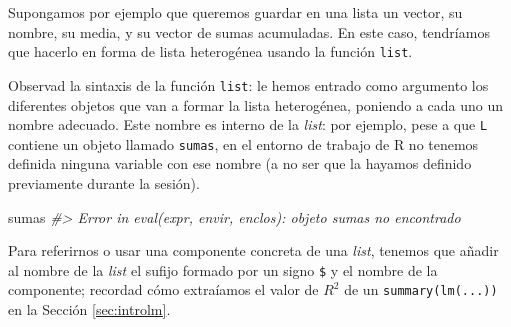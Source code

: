 \documentclass[
]{book}
\newenvironment{Shaded}{\begin{snugshade}}{\end{snugshade}}
\newcommand{\CommentTok}[1]{\textcolor[rgb]{0.56,0.35,0.01}{\textit{#1}}}
\newcommand{\DataTypeTok}[1]{\textcolor[rgb]{0.13,0.29,0.53}{#1}}
\newcommand{\DecValTok}[1]{\textcolor[rgb]{0.00,0.00,0.81}{#1}}
\newcommand{\KeywordTok}[1]{\textcolor[rgb]{0.13,0.29,0.53}{\textbf{#1}}}
\newcommand{\NormalTok}[1]{#1}
\newcommand{\OperatorTok}[1]{\textcolor[rgb]{0.81,0.36,0.00}{\textbf{#1}}}
\newcommand{\StringTok}[1]{\textcolor[rgb]{0.31,0.60,0.02}{#1}}
\theoremstyle{definition}
\theoremstyle{definition}
\theoremstyle{definition}
\theoremstyle{remark}
\begin{document}
Supongamos por ejemplo que queremos guardar en una lista un vector, su nombre, su media, y su vector de sumas acumuladas. En este caso, tendríamos que hacerlo en forma de lista heterogénea usando la función \texttt{list}.

\begin{Shaded}
\end{Shaded}

Observad la sintaxis de la función \texttt{list}: le hemos entrado como argumento los diferentes objetos que van a formar la lista heterogénea, poniendo a cada uno un nombre adecuado. Este nombre es interno de la \emph{list}: por ejemplo, pese a que \texttt{L} contiene un objeto llamado \texttt{sumas}, en el entorno de trabajo de R no tenemos definida ninguna variable con ese nombre (a no ser que la hayamos definido previamente durante la sesión).

\begin{Shaded}
\begin{Highlighting}[]
\NormalTok{sumas}
\CommentTok{\#\textgreater{} Error in eval(expr, envir, enclos): objeto \textquotesingle{}sumas\textquotesingle{} no encontrado}
\end{Highlighting}
\end{Shaded}

Para referirnos o usar una componente concreta de una \emph{list}, tenemos que añadir al nombre de la \emph{list} el sufijo formado por un signo \texttt{\$} y el nombre de la componente; recordad cómo extraíamos el valor de \(R^2\) de un \texttt{summary(lm(...))} en la Sección \ref{sec:introlm}.
\end{document}
